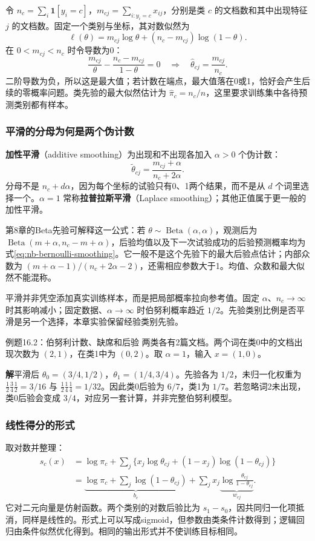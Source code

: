 \documentclass[UTF8,fontset=none,zihao=-4,a4paper]{ctexart}
\newcommand{\term}[1]{\textbf{#1}}
\newcommand{\sol}{\par\noindent\textbf{解}\quad}
\numberwithin{equation}{section}
\numberwithin{figure}{section}
\begin{document}
令 $n_c=\sum_i\mathbf1[y_i=c]$，$m_{cj}=\sum_{i:y_i=c}x_{ij}$，分别是类 $c$ 的文档数和其中出现特征 $j$ 的文档数。固定一个类别与坐标，其对数似然为
\[
 \ell(\theta)=m_{cj}\log\theta+(n_c-m_{cj})\log(1-\theta).
\]
在 $0<m_{cj}<n_c$ 时令导数为0：
\[
 \frac{m_{cj}}\theta-\frac{n_c-m_{cj}}{1-\theta}=0
 \quad\Longrightarrow\quad\widehat\theta_{cj}=\frac{m_{cj}}{n_c}.
\]
二阶导数为负，所以这是最大值；若计数在端点，最大值落在0或1，恰好会产生后续的零概率问题。类先验的最大似然估计为 $\widehat\pi_c=n_c/n$，这里要求训练集中各待预测类别都有样本。

\subsubsection{平滑的分母为何是两个伪计数}
\term{加性平滑}（additive smoothing）为出现和不出现各加入 $\alpha>0$ 个伪计数：
\begin{equation}\label{eq:nb-bernoulli-smoothing}
 \widetilde\theta_{cj}=\frac{m_{cj}+\alpha}{n_c+2\alpha}.
\end{equation}
分母不是 $n_c+d\alpha$，因为每个坐标的试验只有0、1两个结果，而不是从 $d$ 个词里选择一个。$\alpha=1$ 常称\term{拉普拉斯平滑}（Laplace smoothing）；其他正值属于更一般的加性平滑。

第8章的Beta先验可解释这一公式：若 $\theta\sim\operatorname{Beta}(\alpha,\alpha)$，观测后为 $\operatorname{Beta}(m+\alpha,n_c-m+\alpha)$，后验均值以及下一次试验成功的后验预测概率均为式\eqref{eq:nb-bernoulli-smoothing}。它一般不是这个先验下的最大后验点估计；内部众数为 $(m+\alpha-1)/(n_c+2\alpha-2)$，还需相应参数大于1。均值、众数和最大似然不能混称。

平滑并非凭空添加真实训练样本，而是把局部概率拉向参考值。固定 $\alpha$、$n_c\to\infty$ 时其影响减小；固定数据、$\alpha\to\infty$ 时伯努利概率趋近 $1/2$。先验类别比例是否平滑是另一个选择，本章实验保留经验类别先验。

\begin{infobox}[unbreakable]{例题16.2：伯努利计数、缺席和后验}
两类各有2篇文档。两个词在类0中的文档出现次数为 $(2,1)$，在类1中为 $(0,2)$。取 $\alpha=1$，输入 $x=(1,0)$。
\sol 平滑后 $\theta_0=(3/4,1/2)$，$\theta_1=(1/4,3/4)$。先验各为 $1/2$，未归一化权重为 $\frac12\frac34\frac12=3/16$ 与 $\frac12\frac14\frac14=1/32$。因此类0后验为 $6/7$，类1为 $1/7$。若忽略词2未出现，类0后验会变成 $3/4$，对应另一套计算，并非完整伯努利模型。
\end{infobox}

\subsubsection{线性得分的形式}
取对数并整理：
\begin{align*}
 s_c(x)&=\log\pi_c+\sum_j\{x_j\log\theta_{cj}+(1-x_j)\log(1-\theta_{cj})\}\\
 &=\underbrace{\log\pi_c+\sum_j\log(1-\theta_{cj})}_{b_c}
   +\sum_jx_j\underbrace{\log\frac{\theta_{cj}}{1-\theta_{cj}}}_{w_{cj}}.
\end{align*}
它对二元向量是仿射函数。两个类别的对数后验比为 $s_1-s_0$，因共同归一化项抵消，同样是线性的。形式上可以写成sigmoid，但参数由类条件计数得到；逻辑回归由条件似然优化得到。相同的输出形式并不使训练目标相同。
\end{document}
